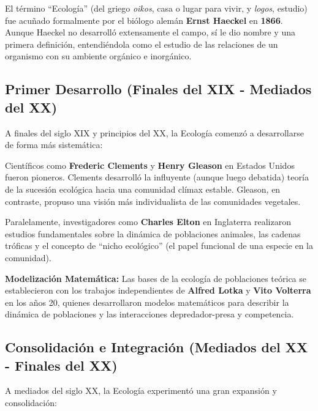 \documentclass[
]{book}
\begin{document}
El término ``Ecología'' (del griego \emph{oikos}, casa o lugar para vivir, y \emph{logos}, estudio) fue acuñado formalmente por el biólogo alemán \textbf{Ernst Haeckel} en \textbf{1866}. Aunque Haeckel no desarrolló extensamente el campo, sí le dio nombre y una primera definición, entendiéndola como el estudio de las relaciones de un organismo con su ambiente orgánico e inorgánico.

\subsection*{\texorpdfstring{\textbf{Primer Desarrollo (Finales del XIX - Mediados del XX)}}{Primer Desarrollo (Finales del XIX - Mediados del XX)}}\label{primerd}

A finales del siglo XIX y principios del XX, la Ecología comenzó a desarrollarse de forma más sistemática:

Científicos como \textbf{Frederic Clements} y \textbf{Henry Gleason} en Estados Unidos fueron pioneros. Clements desarrolló la influyente (aunque luego debatida) teoría de la sucesión ecológica hacia una comunidad clímax estable. Gleason, en contraste, propuso una visión más individualista de las comunidades vegetales.

Paralelamente, investigadores como \textbf{Charles Elton} en Inglaterra realizaron estudios fundamentales sobre la dinámica de poblaciones animales, las cadenas tróficas y el concepto de ``nicho ecológico'' (el papel funcional de una especie en la comunidad).

\textbf{Modelización Matemática:} Las bases de la ecología de poblaciones teórica se establecieron con los trabajos independientes de \textbf{Alfred Lotka} y \textbf{Vito Volterra} en los años 20, quienes desarrollaron modelos matemáticos para describir la dinámica de poblaciones y las interacciones depredador-presa y competencia.

\subsection*{\texorpdfstring{\textbf{Consolidación e Integración (Mediados del XX - Finales del XX)}}{Consolidación e Integración (Mediados del XX - Finales del XX)}}\label{consolid}

A mediados del siglo XX, la Ecología experimentó una gran expansión y consolidación:
\end{document}
